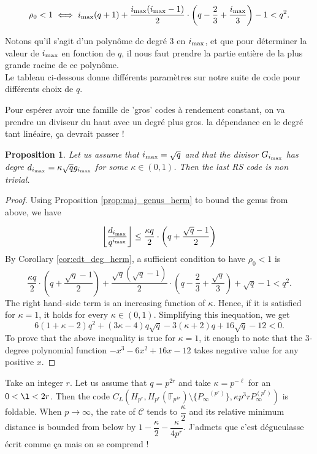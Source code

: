 \documentclass[10pt]{article}
\newtheorem{prop1}{Proposition}[]
\newcommand{\cd}{\cdot}
\newcommand{\ii}{i_{\rm{max}}}
\newcommand{\jade}[1]{{\color{blue!50!red}#1}}
\newcommand{\Floor}[1]{\left\lfloor#1\right\rfloor}
\newcommand{\F}{\mathbb{F}}
\newcommand{\calC}{\mathcal{C}}
\begin{document}
\[ \rho_0 < 1 \iff \ii(q+1) + \dfrac{\ii(\ii-1)}{2}\cd \left(q-\frac{2}{3} + \frac{\ii}{3}\right) -1 < q^2.\]

Notons qu'il s'agit d'un polynôme de degré 3 en $\ii$, et que pour déterminer la valeur de $\ii$ en fonction de $q$, il nous faut prendre la partie entière de la plus grande racine de ce polynôme. \\
Le tableau ci-dessous donne différents paramètres sur notre suite de code pour différents choix de $q$.


\jade{Pour espérer avoir une famille de 'gros' codes à rendement constant, on va prendre un diviseur du haut avec un degré plus gros. la dépendance en le degré tant linéaire, ça devrait passer !}

\begin{prop1}
	Let us assume that $\ii=\sqrt{q}$ and that the divisor $G_{\ii}$ has degre $d_{\ii} = \kappa \sqrt{q}g_{\ii}$ for some $\kappa \in (0,1)$.
	Then \jade{the last RS code} is non trivial.
\end{prop1}
\begin{proof}
	Using Proposition \ref{prop:maj_genus_herm} to bound the genus from above, we have
	
	\[ \Floor{\dfrac{d_{\ii}}{q^{\ii}}} \leq  \dfrac{\kappa q}{2} \cd \left( q + \dfrac{\sqrt{q}-1}{2} \right)\]
	By Corollary \ref{cor:cdt_deg_herm}, a sufficient condition to have $\rho_0 < 1$ is
	\[\dfrac{\kappa q}{2} \cd \left( q + \dfrac{\sqrt{q}-1}{2} \right)+\dfrac{\sqrt{q}(\sqrt{q}-1)}{2}\cd \left(q-\frac{2}{3} + \frac{\sqrt{q}}{3}\right) + \sqrt{q}-1 < q^2.\]
	The right hand--side term is an increasing function of $\kappa$. Hence, if it is satisfied for $\kappa=1$, it holds for every $\kappa \in (0,1)$. Simplifying this inequation, we get 
	\[6(1+\kappa - 2) q^2 + (3\kappa-4)q\sqrt{q}-3(\kappa+2)q+16\sqrt{q}-12 <0.\]
	To prove that the above inequality is true for $\kappa=1$, it enough to note that the 3-degree polynomial function $-x^3-6x^2+16x-12$ takes negative value for any positive $x$.
\end{proof}

Take an integer $r$. Let us assume that $q=p^{2r}$ and take $\kappa=p^{-\ell}$ for an $0<\l<2r$. Then the code $C_L\left(H_{p^r},H_{p^r}( \F_{p^{4r}} )\setminus\{ {P_\infty}^{(p^r)} \}, \kappa p^3rP_\infty^{(p^r)}\right)$ is foldable. When $p \rightarrow \infty$, the rate of $\calC$ tends to $\dfrac{\kappa}{2}$ and its relative minimum distance is bounded from below by $1-\dfrac{\kappa}{2}-\dfrac{\kappa}{4p^r}$.
\jade{J'admets que c'est dégueulasse écrit comme ça mais on se comprend !}
\end{document}
